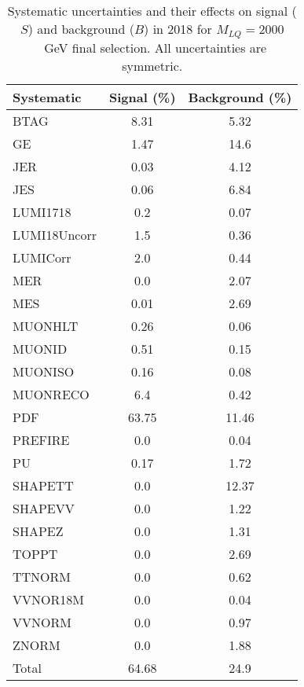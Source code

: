 \begin{table}[htbp]
\begin{center}
\caption{Systematic uncertainties and their effects on signal ($S$) and background ($B$) in 2018 for $M_{LQ}=2000$~GeV final selection. All uncertainties are symmetric.}
\begin{tabular}{lcc}
\hline\hline
Systematic & Signal (\%) & Background (\%) \\ \hline 
BTAG & 8.31 & 5.32\\ 
GE & 1.47 & 14.6\\ 
JER & 0.03 & 4.12\\ 
JES & 0.06 & 6.84\\ 
LUMI1718 & 0.2 & 0.07\\ 
LUMI18Uncorr & 1.5 & 0.36\\ 
LUMICorr & 2.0 & 0.44\\ 
MER & 0.0 & 2.07\\ 
MES & 0.01 & 2.69\\ 
MUONHLT & 0.26 & 0.06\\ 
MUONID & 0.51 & 0.15\\ 
MUONISO & 0.16 & 0.08\\ 
MUONRECO & 6.4 & 0.42\\ 
PDF & 63.75 & 11.46\\ 
PREFIRE & 0.0 & 0.04\\ 
PU & 0.17 & 1.72\\ 
SHAPETT & 0.0 & 12.37\\ 
SHAPEVV & 0.0 & 1.22\\ 
SHAPEZ & 0.0 & 1.31\\ 
TOPPT & 0.0 & 2.69\\ 
TTNORM & 0.0 & 0.62\\ 
VVNOR18M & 0.0 & 0.04\\ 
VVNORM & 0.0 & 0.97\\ 
ZNORM & 0.0 & 1.88\\ 
Total & 64.68 & 24.9\\ \hline \hline
\end{tabular}
\label{tab:SysUncertainties_uujj_2000}
\end{center}
\end{table}

